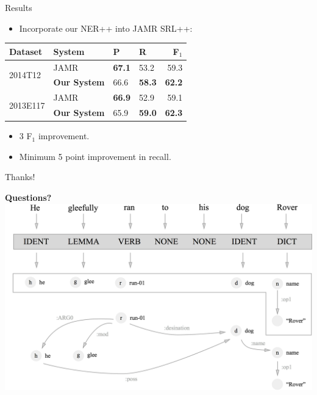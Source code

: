 \documentclass[hyperref]{beamer}
\newcommand\hh[1]{\textbf{\textcolor[rgb]{0.5,0,0}{#1}}}
\begin{document}
\begin{frame}{Results}
\begin{itemize}
  \item Incorporate our NER++ into JAMR SRL++:
\end{itemize}

\begin{center}
\begin{tabular}{l|l|llr}
\textbf{Dataset} &  \textbf{System} & \textbf{P} & \textbf{R} & \textbf{F$_1$} \\
\hline
\multirow{2}{*}{2014T12} & JAMR & \textbf{67.1} & 53.2 & 59.3 \\
  & \textbf{Our System} & 66.6 & \textbf{58.3} & \textbf{62.2} \\
\hline
\multirow{2}{*}{2013E117} & JAMR & \textbf{66.9} & 52.9 & 59.1 \\
  & \textbf{Our System} & 65.9 & \textbf{59.0} & \textbf{62.3} \\
\end{tabular}
\end{center}

\begin{itemize}
  \item 3 F$_1$ improvement.
  \item Minimum 5 point improvement in recall.
\end{itemize}
\end{frame}

\begin{frame}{Thanks!}
\begin{center}
\hh{Questions?} \\
\vspace{1em}
\includegraphics[scale=0.15]{concept.png}
\end{center}
\end{frame}
\end{document}
